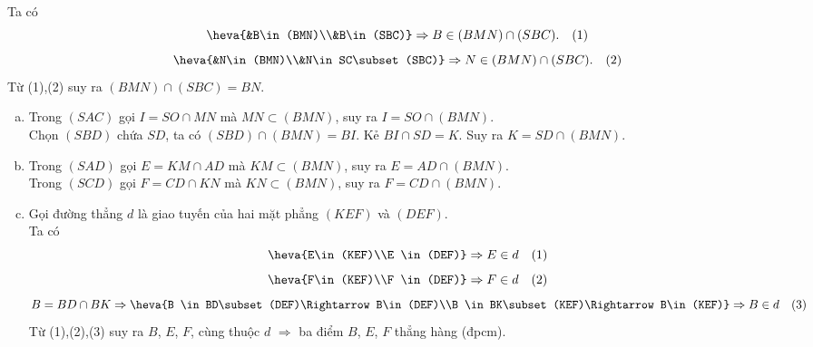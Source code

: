 \begin{bt}
{{}
		
		Ta có 
		$$\heva{&B\in(BMN)\\&B\in(SBC)}\Rightarrow B\in(BMN)\cap(SBC).\quad(1)$$
		$$\heva{&N\in(BMN)\\&N\in SC\subset(SBC)}\Rightarrow N\in(BMN)\cap(SBC).\quad(2)$$
		Từ (1),(2) suy ra $(BMN)\cap(SBC)=BN$.
		\begin{enumerate}[b)]
			\item Trong $(SAC)$ gọi $I=SO\cap MN$ mà $MN\subset(BMN)$, suy ra $I=SO\cap(BMN)$.\\
			Chọn $(SBD)$ chứa $SD$, ta có $(SBD)\cap(BMN)=BI$. Kẻ $BI\cap SD=K$. Suy ra $K=SD\cap(BMN)$.
			\item Trong $(SAD)$ gọi $E=KM\cap AD$ mà $KM\subset(BMN)$, suy ra $E=AD\cap(BMN)$.\\
			Trong $(SCD)$ gọi $F=CD\cap KN$ mà $KN\subset(BMN)$, suy ra $F=CD\cap(BMN)$.
			\item Gọi đường thẳng $d$ là giao tuyến của hai mặt phẳng $(KEF)$ và $(DEF)$.\\
			Ta có 
			$$\heva{E\in(KEF)\\E \in(DEF)}\Rightarrow E\in d\quad (1)$$
			$$\heva{F\in(KEF)\\F \in(DEF)}\Rightarrow F\in d\quad (2)$$
			$$B=BD\cap BK \Rightarrow \heva{B \in BD\subset (DEF)\Rightarrow B\in(DEF)\\B \in BK\subset (KEF)\Rightarrow B\in(KEF)}\Rightarrow B\in d\quad (3)$$
			Từ (1),(2),(3) suy ra $B$, $E$, $F$, cùng thuộc $d$ $\Rightarrow$ ba điểm $B$, $E$, $F$ thẳng hàng (đpcm).
	\end{enumerate}	}
\end{bt}

